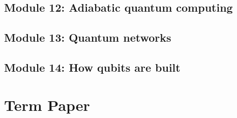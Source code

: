 \subsection{Module 12: Adiabatic quantum computing}


\subsection{Module 13: Quantum networks}


\subsection{Module 14: How qubits are built}


\section{Term Paper}



